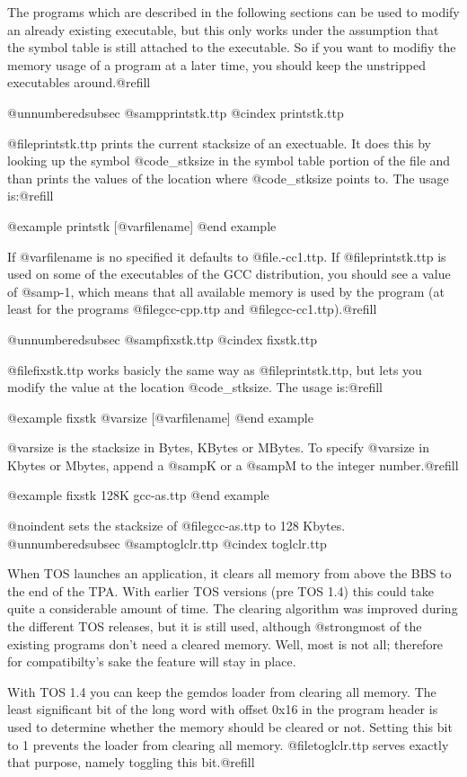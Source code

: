 {{{{{The programs which are described in the following sections can
be used to modify an already existing executable, but this only
works under the assumption that the symbol table is still attached
to the executable. So if you want to modifiy the memory usage of a
program at a later time, you should keep the unstripped executables
around.@refill

@unnumberedsubsec @samp{printstk.ttp}
@cindex printstk.ttp

@file{printstk.ttp} prints the current stacksize of an exectuable.
It does this by looking up the symbol @code{_stksize} in the
symbol table portion of the file and than prints the values of the
location where @code{_stksize} points to. The usage is:@refill

@example
printstk [@var{filename}]
@end example

If @var{filename} is no specified it defaults to @file{.\gcc-cc1.ttp}.
If @file{printstk.ttp} is used on some of the executables of the GCC
distribution, you should see a value of @samp{-1}, which means that all
available memory is used by the program (at least for the programs
@file{gcc-cpp.ttp} and @file{gcc-cc1.ttp}).@refill

@unnumberedsubsec @samp{fixstk.ttp}
@cindex fixstk.ttp

@file{fixstk.ttp} works basicly the same way as @file{printstk.ttp},
but lets you modify the value at the location @code{_stksize}. The
usage is:@refill

@example
fixstk @var{size} [@var{filename}]
@end example

@var{size} is the stacksize in Bytes, KBytes or MBytes. To specify
@var{size} in Kbytes or Mbytes, append a @samp{K} or a @samp{M} to the
integer number.@refill

@example
fixstk 128K gcc-as.ttp
@end example

@noindent
sets the stacksize of @file{gcc-as.ttp} to 128 Kbytes.
@unnumberedsubsec @samp{toglclr.ttp}
@cindex toglclr.ttp

When TOS launches an application, it clears all memory from above the BBS
to the end of the TPA. With earlier TOS versions (pre TOS 1.4) this
could take quite a considerable amount of time. The clearing algorithm
was improved during the different TOS releases, but it is still used,
although @strong{most} of the existing programs don't need a cleared
memory. Well, most is not all; therefore for compatibilty's sake the
feature will stay in place.

With TOS 1.4 you can keep the gemdos loader from clearing all memory.
The least significant bit of the long word with offset 0x16 in the
program header is used to determine whether the memory should be cleared
or not. Setting this bit to 1 prevents the loader from clearing all memory.
@file{toglclr.ttp} serves exactly that purpose, namely toggling this
bit.@refill

}}}}}
